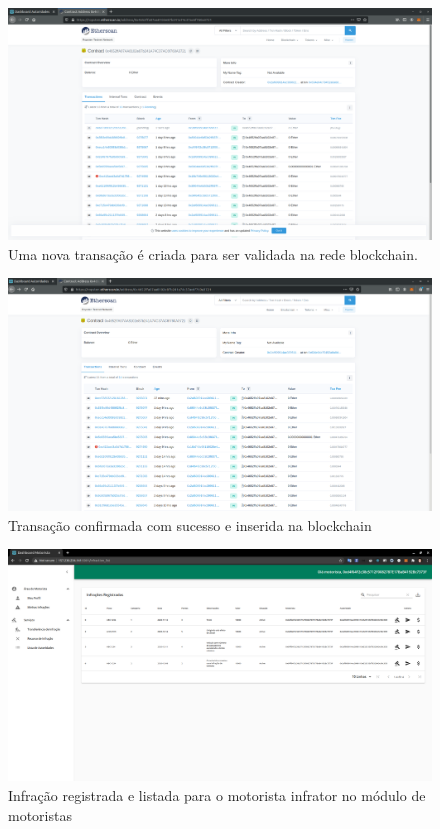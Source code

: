     \begin{figure}[H]
         \centering
         \includegraphics[scale=0.2]{figuras/capitulo_5/registro/print_5.png}
         \caption{Uma nova transação é criada para ser validada na rede blockchain.}
         \label{fig:dapp_rede_ethereum}
    \end{figure}
    
    \begin{figure}[H]
         \centering
         \includegraphics[scale=0.2]{figuras/capitulo_5/registro/print_6.png}
         \caption{Transação confirmada com sucesso e inserida na blockchain}
         \label{fig:dapp_rede_ethereum}
    \end{figure}
    
    
    \begin{figure}[H]
         \centering
         \includegraphics[scale=0.2]{figuras/capitulo_5/registro/print_7.png}
         \caption{Infração registrada e listada para o motorista infrator no módulo de motoristas}
         \label{fig:dapp_rede_ethereum}
    \end{figure}
    
